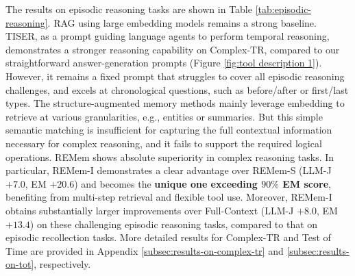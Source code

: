 \documentclass{article} %
\newcommand{\ours}{REMem\xspace}
\begin{document}
The results on episodic reasoning tasks are shown in Table \ref{tab:episodic-reasoning}.
RAG using large embedding models remains a strong baseline.
TISER, as a prompt guiding language agents to perform temporal reasoning, demonstrates a stronger reasoning capability on Complex-TR, compared to our straightforward answer-generation prompts (Figure \ref{fig:tool description 1}). 
However, it remains a fixed prompt that struggles to cover all episodic reasoning challenges, and excels at chronological questions, such as before/after or first/last types.
The structure-augmented memory methods mainly leverage embedding to retrieve at various granularities, e.g., entities or summaries. 
But this simple semantic matching is insufficient for capturing the full contextual information necessary for complex reasoning, and it fails to support the required logical operations.
\ours shows absolute superiority in complex reasoning tasks.
In particular, \ours-I demonstrates a clear advantage over \ours-S (LLM-J $+7.0$, EM $+20.6$) and becomes the \textbf{unique one exceeding $90\%$ EM score}, benefiting from multi-step retrieval and flexible tool use.
Moreover, \ours-I obtains substantially larger improvements over Full-Context (LLM-J $+8.0$, EM $+13.4$) on these challenging episodic reasoning tasks, compared to that on episodic recollection tasks.
More detailed results for Complex-TR and Test of Time are provided in Appendix \ref{subsec:results-on-complex-tr} and \ref{subsec:results-on-tot}, respectively.
\end{document}
